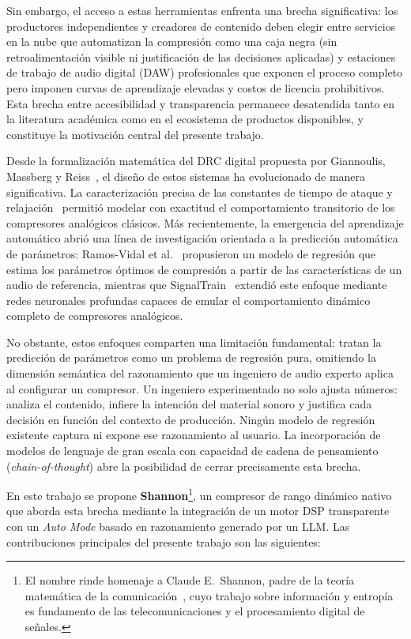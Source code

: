 \documentclass[a4paper,12pt]{article}
\begin{document}
Sin embargo, el acceso a estas herramientas enfrenta una brecha significativa:
los productores independientes y creadores de contenido deben elegir entre
servicios en la nube que automatizan la compresión como una caja negra (sin
retroalimentación visible ni justificación de las decisiones aplicadas) y
estaciones de trabajo de audio digital (DAW) profesionales que exponen el proceso
completo pero imponen curvas de aprendizaje elevadas y costos de licencia
prohibitivos. Esta brecha entre accesibilidad y transparencia permanece desatendida
tanto en la literatura académica como en el ecosistema de productos disponibles,
y constituye la motivación central del presente trabajo.

Desde la formalización matemática del DRC digital propuesta por Giannoulis, Massberg
y Reiss~\cite{giannoulis2012}, el diseño de estos sistemas ha evolucionado de manera
significativa. La caracterización precisa de las constantes de tiempo de ataque y
relajación~\cite{floru1999} permitió modelar con exactitud el comportamiento
transitorio de los compresores analógicos clásicos. Más recientemente, la emergencia
del aprendizaje automático abrió una línea de investigación orientada a la predicción
automática de parámetros: Ramos-Vidal et al.~\cite{ramos2017} propusieron un modelo
de regresión que estima los parámetros óptimos de compresión a partir de las
características de un audio de referencia, mientras que SignalTrain~\cite{signaltrain2019}
extendió este enfoque mediante redes neuronales profundas capaces de emular el
comportamiento dinámico completo de compresores analógicos.

No obstante, estos enfoques comparten una limitación fundamental: tratan la
predicción de parámetros como un problema de regresión pura, omitiendo la dimensión
semántica del razonamiento que un ingeniero de audio experto aplica al configurar un
compresor. Un ingeniero experimentado no solo ajusta números: analiza el contenido,
infiere la intención del material sonoro y justifica cada decisión en función del
contexto de producción. Ningún modelo de regresión existente captura ni expone ese
razonamiento al usuario. La incorporación de modelos de lenguaje de gran escala con
capacidad de cadena de pensamiento (\textit{chain-of-thought}) abre la posibilidad
de cerrar precisamente esta brecha.

En este trabajo se propone \textbf{Shannon}\footnote{El nombre rinde homenaje a
Claude E.\ Shannon, padre de la teoría matemática de la comunicación~\cite{shannon1948},
cuyo trabajo sobre información y entropía es fundamento de las telecomunicaciones
y el procesamiento digital de señales.}, un compresor de rango dinámico nativo
que aborda esta brecha mediante la integración de un motor DSP transparente con un
\textit{Auto Mode} basado en razonamiento generado por un LLM. Las contribuciones
principales del presente trabajo son las siguientes:
\end{document}
